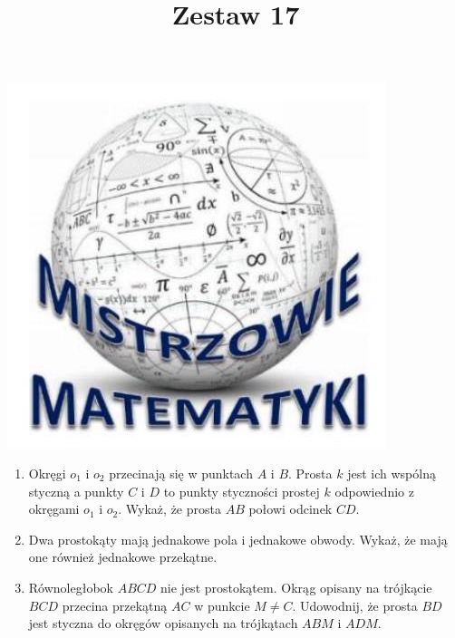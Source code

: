 \documentclass[10pt]{article}
\title{Zestaw 17 }
\author{}
\date{}
\begin{document}
\maketitle
\begin{center}
\includegraphics[max width=\textwidth]{2024_11_21_cf2285985aa7c8867f3cg-1}
\end{center}

\begin{enumerate}
  \item Okręgi \(o_{1}\) i \(o_{2}\) przecinają się w punktach \(A\) i \(B\). Prosta \(k\) jest ich wspólną styczną a punkty \(C\) i \(D\) to punkty styczności prostej \(k\) odpowiednio z okręgami \(o_{1}\) i \(o_{2}\). Wykaż, że prosta \(A B\) połowi odcinek \(C D\).
  \item Dwa prostokąty mają jednakowe pola i jednakowe obwody. Wykaż, że mają one również jednakowe przekątne.
  \item Równoległobok \(A B C D\) nie jest prostokątem. Okrąg opisany na trójkącie \(B C D\) przecina przekątną \(A C\) w punkcie \(M \neq C\). Udowodnij, że prosta \(B D\) jest styczna do okręgów opisanych na trójkątach \(A B M\) i \(A D M\).
\end{enumerate}
\end{document}
